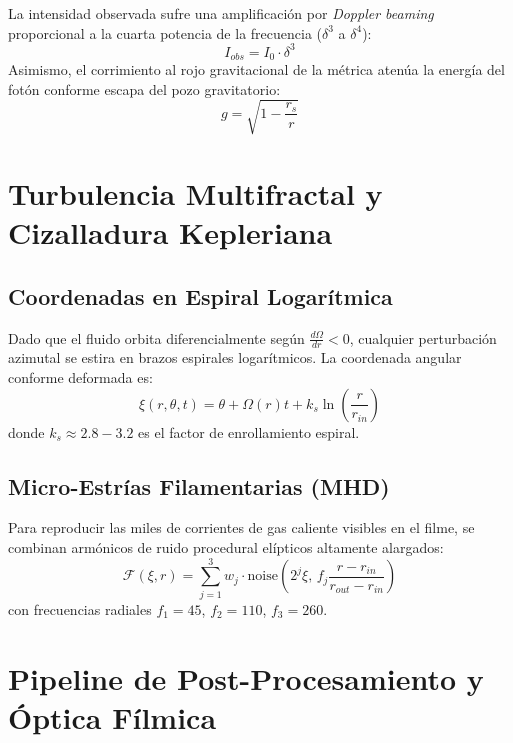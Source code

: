 \documentclass[10pt,twocolumn,a4paper]{article}
\begin{document}
La intensidad observada sufre una amplificación por \textit{Doppler beaming} proporcional a la cuarta potencia de la frecuencia ($\delta^3$ a $\delta^4$):
\begin{equation}
I_{obs} = I_0 \cdot \delta^3
\end{equation}
Asimismo, el corrimiento al rojo gravitacional de la métrica atenúa la energía del fotón conforme escapa del pozo gravitatorio:
\begin{equation}
g = \sqrt{1 - \frac{r_s}{r}}
\end{equation}

\section{Turbulencia Multifractal y Cizalladura Kepleriana}

\subsection{Coordenadas en Espiral Logarítmica}
Dado que el fluido orbita diferencialmente según $\frac{d\Omega}{dr} < 0$, cualquier perturbación azimutal se estira en brazos espirales logarítmicos. La coordenada angular conforme deformada es:
\begin{equation}
\xi(r, \theta, t) = \theta + \Omega(r) t + k_s \ln\left(\frac{r}{r_{in}}\right)
\end{equation}
donde $k_s \approx 2.8 - 3.2$ es el factor de enrollamiento espiral.

\subsection{Micro-Estrías Filamentarias (MHD)}
Para reproducir las miles de corrientes de gas caliente visibles en el filme, se combinan armónicos de ruido procedural elípticos altamente alargados:
\begin{equation}
\mathcal{F}(\xi, r) = \sum_{j=1}^3 w_j \cdot \text{noise}\left(2^j \xi,\, f_j \frac{r - r_{in}}{r_{out} - r_{in}}\right)
\end{equation}
con frecuencias radiales $f_1 = 45$, $f_2 = 110$, $f_3 = 260$.

\section{Pipeline de Post-Procesamiento y Óptica Fílmica}
\end{document}
